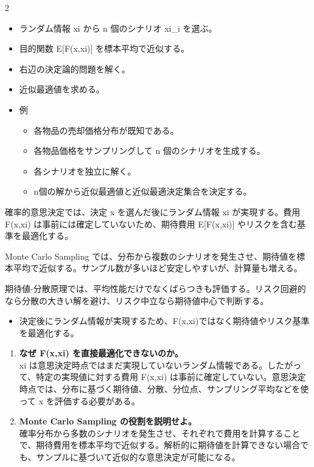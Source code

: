 \clearpage
{}
\begin{multicols}{2}\footnotesize\raggedcolumns
{}
\begin{itemize}
\item ランダム情報 xi から n 個のシナリオ xi\_i を選ぶ。
\item 目的関数 E[F(x,xi)] を標本平均で近似する。
\item 右辺の決定論的問題を解く。
\item 近似最適値を求める。
\item 例
\begin{itemize}
\item 各物品の売却価格分布が既知である。
\item 各物品価格をサンプリングして n 個のシナリオを生成する。
\item 各シナリオを独立に解く。
\item n個の解から近似最適値と近似最適決定集合を決定する。
\end{itemize}
\end{itemize}
確率的意思決定では、決定 x を選んだ後にランダム情報 xi が実現する。費用 F(x,xi) は事前には確定していないため、期待費用 E[F(x,xi)] やリスクを含む基準を最適化する。\par

Monte Carlo Sampling では、分布から複数のシナリオを発生させ、期待値を標本平均で近似する。サンプル数が多いほど安定しやすいが、計算量も増える。\par

期待値-分散原理では、平均性能だけでなくばらつきも評価する。リスク回避的なら分散の大きい解を避け、リスク中立なら期待値中心で判断する。\par
{}
\begin{itemize}
\item 決定後にランダム情報が実現するため、F(x,xi)ではなく期待値やリスク基準を最適化する。
\end{itemize}
\begin{enumerate}
\item \textbf{なぜ F(x,xi) を直接最適化できないのか。}\\xi は意思決定時点ではまだ実現していないランダム情報である。したがって、特定の実現値に対する費用 F(x,xi) は事前に確定していない。意思決定時点では、分布に基づく期待値、分散、分位点、サンプリング平均などを使って x を評価する必要がある。
\item \textbf{Monte Carlo Sampling の役割を説明せよ。}\\確率分布から多数のシナリオを発生させ、それぞれで費用を計算することで、期待費用を標本平均で近似する。解析的に期待値を計算できない場合でも、サンプルに基づいて近似的な意思決定が可能になる。
\end{enumerate}
\end{multicols}


